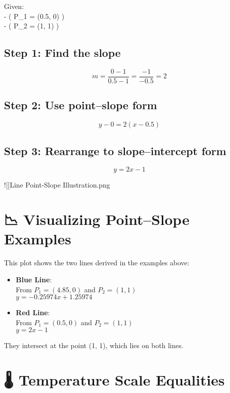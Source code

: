 \documentclass[
  letterpaper,
]{book}
\begin{document}
Given:\\
- ( P\_1 = (0.5, 0) )\\
- ( P\_2 = (1, 1) )

\subsection{Step 1: Find the slope}\label{step-1-find-the-slope-1}

\[
m = \frac{0 - 1}{0.5 - 1} = \frac{-1}{-0.5} = 2
\]

\subsection{Step 2: Use point--slope
form}\label{step-2-use-pointslope-form-1}

\[
y - 0 = 2(x - 0.5)
\]

\subsection{Step 3: Rearrange to slope--intercept
form}\label{step-3-rearrange-to-slopeintercept-form-1}

\[
y = 2x - 1
\]

!{[}{[}Line Point-Slope Illustration.png\textbar500{]}{]}

\section{📉 Visualizing Point--Slope
Examples}\label{visualizing-pointslope-examples}

This plot shows the two lines derived in the examples above:

\begin{itemize}
\item
  \textbf{Blue Line}:\\
  From \(P_1 = (4.85, 0)\) and \(P_2 = (1, 1)\)\\
  \(y = -0.25974x + 1.25974\)
\item
  \textbf{Red Line}:\\
  From \(P_1 = (0.5, 0)\) and \(P_2 = (1, 1)\)\\
  \(y = 2x - 1\)
\end{itemize}

They intersect at the point (1, 1), which lies on both lines.

\section{🌡️ Temperature Scale
Equalities}\label{temperature-scale-equalities}
\end{document}
